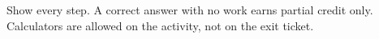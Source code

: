 \begin{remindbox}
Show every step. A correct answer with no work earns partial credit only.
Calculators are allowed on the activity, not on the exit ticket.
\end{remindbox}
